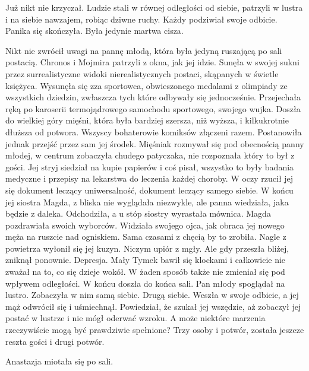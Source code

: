 \divider{}

Już nikt nie krzyczał. 
Ludzie stali w równej odległości od siebie, patrzyli w lustra i na siebie nawzajem, robiąc dziwne ruchy.
Każdy podziwiał swoje odbicie. Panika się skończyła. Była jedynie martwa cisza.

Nikt nie zwrócił uwagi na pannę młodą, która była jedyną ruszającą po sali postacią. Chronos i Mojmira patrzyli z okna, jak jej idzie.
Sunęła w swojej sukni przez surrealistyczne widoki nierealistycznych postaci, skąpanych w świetle księżyca.
Wysunęła się zza sportowca, obwieszonego medalami z olimpiady ze wszystkich dziedzin, zwłaszcza tych które odbywały się jednocześnie.
Przejechała ręką po karoserii termojądrowego samochodu sportowego, swojego wujka.
Doszła do wielkiej góry mięśni, która była bardziej szersza, niż wyższa, i kilkukrotnie dłuższa od potwora. Wszyscy bohaterowie komiksów złączeni razem.
Postanowiła jednak przejść przez sam jej środek. Mięśniak rozmywał się pod obecnością panny młodej, w centrum zobaczyła chudego patyczaka, nie rozpoznała który to był z gości.
Jej stryj siedział na kupie papierów i coś pisał, wszystko to były badania medyczne i przepisy na lekarstwa do leczenia każdej choroby.
W oczy rzucił jej się dokument leczący uniwersalność, dokument leczący samego siebie.
W końcu jej siostra Magda, z bliska nie wyglądała niezwykle, ale panna wiedziała, jaka będzie z daleka. 
Odchodziła, a u stóp siostry wyrastała mównica. Magda pozdrawiała swoich wyborców.
Widziała swojego ojca, jak obraca jej nowego męża na ruszcie nad ogniskiem. Sama czasami z chęcią by to zrobiła.
Nagle z powietrza wyłonił się jej kuzyn. Niczym upiór z mgły.
Ale gdy przeszła bliżej, zniknął ponownie. Depresja.
Mały Tymek bawił się klockami i całkowicie nie zważał na to, co się dzieje wokół. 
W żaden sposób także nie zmieniał się pod wpływem odległości.
W końcu doszła do końca sali. Pan młody spoglądał na lustro. Zobaczyła w nim samą siebie. Drugą siebie.
Weszła w swoje odbicie, a jej mąż odwrócił się i uśmiechnął. Powiedział, że szukał jej wszędzie, aż zobaczył jej postać w lustrze i nie mógł oderwać wzroku.
A może niektóre marzenia rzeczywiście mogą być prawdziwie spełnione?
Trzy osoby i potwór, została jeszcze reszta gości i drugi potwór.

Anastazja miotała się po sali.

